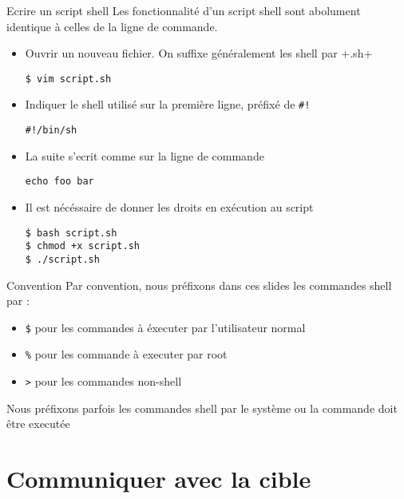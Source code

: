 \begin{frame}[fragile=singleslide]{Ecrire un script shell}
  Les  fonctionnalité d'un  script  shell sont  abolument identique  à
  celles de la ligne de commande.
  \begin{itemize}
  \item Ouvrir  un nouveau fichier. On suffixe  généralement les shell
    par \file+.sh+
    \begin{lstlisting}
$ vim script.sh
    \end{lstlisting} %
  \item Indiquer  le shell utilisé  sur la première ligne,  préfixé de
    \verb+#!+
    \begin{lstlisting}
#!/bin/sh
    \end{lstlisting} %
  \item La suite s'ecrit comme sur la ligne de commande
    \begin{lstlisting}
echo foo bar
    \end{lstlisting} %
  \item Il est nécéssaire de donner les droits en exécution au script
    \begin{lstlisting}
$ bash script.sh
$ chmod +x script.sh
$ ./script.sh
    \end{lstlisting} %
  \end{itemize}
\end{frame}

\begin{frame}[fragile=singleslide]{Convention}
  Par convention,  nous préfixons dans ces slides  les commandes shell
  par :
  \begin{itemize}
  \item  \verb+$+  pour les  commandes  à  éxecuter par  l'utilisateur
    normal
  \item \verb+%+ pour les commande à executer par root
  \item \verb+>+ pour les commandes non-shell
  \end{itemize}
  Nous  préfixons parfois  les commandes  shell par  le système  ou la
  commande doit être executée
\end{frame}

\section{Communiquer avec la cible}

